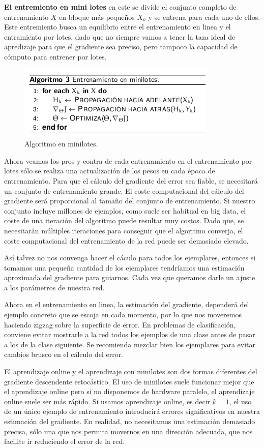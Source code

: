 \textbf{El entremiento en mini lotes} en este se divide el conjunto completo de entrenamiento $X$ en bloque más pequeños $X_k$ y se entrena para cada uno de ellos. Este entremiento busca un equilibrio entre el entrenamiento en linea y el entramiento por lotes, dado que no siempre vamos a tener la taza ideal de apredizaje para que el gradiente sea preciso, pero tampoco la capacidad de cómputo para entrener por lotes. 

\begin{figure}[H]
 \centering
 \includegraphics[scale=0.5]{../Figuras/algoritmoMiniLotes.png}
 \caption{Algoritmo en minilotes.}
 \label{fig:enLotes}
\end{figure}

Ahora veamos los pros y contra de cada entrenamiento en el entrenamiento por lotes sólo se realiza
una actualización de los pesos en cada época de entrenamiento. Para que el cálculo del gradiente del error sea fiable, se necesitará un conjunto de entrenamiento grande.
El coste computacional del cálculo del gradiente será proporcional al tamaño del conjunto de entrenamiento. Si
nuestro conjunto incluye millones de ejemplos, como suele ser habitual en big data, el coste de una iteración del algoritmo puede resultar muy costos. Dado que, se necesitarán múltiples iteraciones para conseguir que el algoritmo converja, el coste computacional del entrenamiento de la red puede ser demasiado elevado.

Así talvez no nos convenga hacer el cáculo para todos los ejemplares, entonces si tomamos una pequeña cantidad de los ejemplares tendríamos una estimación aproximada del gradiente para guiarnos. Cada vez que queramos darle un ajuste a los parámetros de nuestra red.

Ahora en el entrenamiento en linea, la estimación del gradiente, dependerá del ejemplo concreto que se escoja en cada momento, por lo que nos moveremos haciendo zigzag sobre la superficie de error. En problemas de clasificación, conviene evitar mostrarle a la red todos los ejemplos de una clase antes de pasar a los de la clase siguiente. Se recomienda mezclar bien los ejemplares para evitar cambios brusco en el cálculo del error. 

El aprendizaje online y el aprendizaje con minilotes son dos formas diferentes del gradiente descendente estocástico. El uso de minilotes suele funcionar mejor que el aprendizaje online pero si no disponemos de hardware paralelo, el aprendizaje online suele ser más rápido. Si usamos aprendizaje online, es decir $k = 1$, el uso de un único ejemplo de entrenamiento introducirá errores significativos en nuestra estimación del gradiente. En realidad, no necesitamos una estimación demasiado precisa, sólo una que nos permita movernos en una dirección adecuada, que nos facilite ir reduciendo el error de la red.
